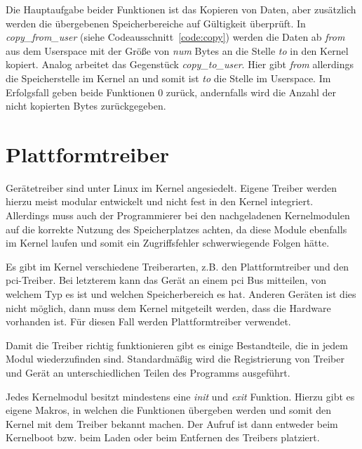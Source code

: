 Die Hauptaufgabe beider Funktionen ist das Kopieren von Daten, aber zusätzlich werden die übergebenen Speicherbereiche auf Gültigkeit überprüft. 
In \textit{copy\_from\_user} (siehe Codeausschnitt~\ref{code:copy}) werden die Daten ab \textit{from} aus dem Userspace mit der Größe von \textit{num} Bytes an die Stelle \textit{to} in den Kernel kopiert.
Analog arbeitet das Gegenstück \textit{copy\_to\_user}. Hier gibt \textit{from} allerdings die Speicherstelle im Kernel an und somit ist \textit{to} die Stelle im Userspace.
Im Erfolgsfall geben beide Funktionen 0 zurück, andernfalls wird die Anzahl der nicht kopierten Bytes zurückgegeben. \citep[S. 250f.]{schroder2009embedded}%

\section{Plattformtreiber}\label{sec:plat_t}
Gerätetreiber sind unter Linux im Kernel angesiedelt. Eigene Treiber werden hierzu meist modular entwickelt und nicht fest in den Kernel integriert. Allerdings muss auch der Programmierer bei den nachgeladenen Kernelmodulen auf die korrekte Nutzung des Speicherplatzes achten, da diese Module ebenfalls im Kernel laufen und somit ein Zugriffsfehler schwerwiegende Folgen hätte. \citep[S. 231ff.]{schroder2009embedded}%

Es gibt im Kernel verschiedene Treiberarten, z.B. den Plattformtreiber und den \ac{pci}-Treiber. Bei letzterem kann das Gerät an einem \ac{pci} Bus mitteilen, von welchem Typ es ist und welchen Speicherbereich es hat. Anderen Geräten ist dies nicht möglich, dann muss dem Kernel mitgeteilt werden, dass die Hardware vorhanden ist. Für diesen Fall werden Plattformtreiber verwendet. \cite{corbet2005linux}

Damit die Treiber richtig funktionieren gibt es einige Bestandteile, die in jedem Modul wiederzufinden sind. Standardmäßig wird die Registrierung von Treiber und Gerät an unterschiedlichen Teilen des Programms ausgeführt. \cite{corbetplatform} %




Jedes Kernelmodul besitzt mindestens eine \textit{init} und \textit{exit} Funktion. Hierzu gibt es eigene Makros, in welchen die Funktionen übergeben werden und somit den Kernel mit dem Treiber bekannt machen. Der Aufruf ist dann entweder beim Kernelboot bzw. beim Laden oder beim Entfernen des Treibers platziert. \cite[module.h, Zeile 79ff.]{linuxsourceinclude}


